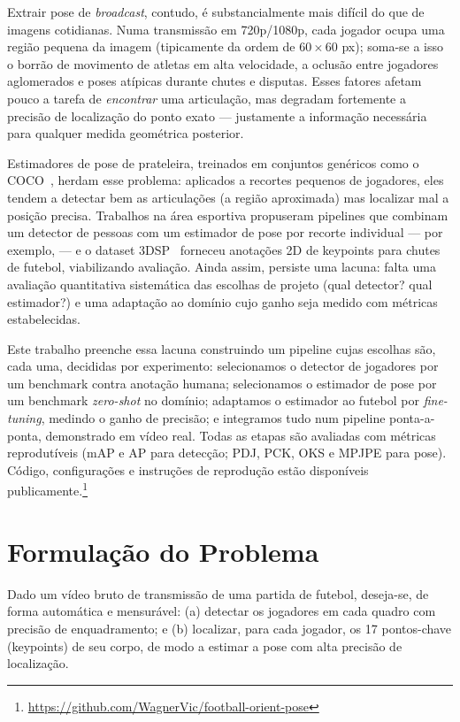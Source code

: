 \documentclass[12pt]{article}
\begin{document}
Extrair pose de \emph{broadcast}, contudo, é substancialmente mais difícil do que de imagens cotidianas. Numa transmissão em 720p/1080p, cada jogador ocupa uma região pequena da imagem (tipicamente da ordem de $60\times60$ px); soma-se a isso o borrão de movimento de atletas em alta velocidade, a oclusão entre jogadores aglomerados e poses atípicas durante chutes e disputas. Esses fatores afetam pouco a tarefa de \emph{encontrar} uma articulação, mas degradam fortemente a precisão de localização do ponto exato --- justamente a informação necessária para qualquer medida geométrica posterior.

Estimadores de pose de prateleira, treinados em conjuntos genéricos como o COCO~\cite{lin2014}, herdam esse problema: aplicados a recortes pequenos de jogadores, eles tendem a detectar bem as articulações (a região aproximada) mas localizar mal a posição precisa. Trabalhos na área esportiva propuseram pipelines que combinam um detector de pessoas com um estimador de pose por recorte individual --- por exemplo, \cite{reis2023} --- e o dataset 3DSP~\cite{yeung2024} forneceu anotações 2D de keypoints para chutes de futebol, viabilizando avaliação. Ainda assim, persiste uma lacuna: falta uma avaliação quantitativa sistemática das escolhas de projeto (qual detector? qual estimador?) e uma adaptação ao domínio cujo ganho seja medido com métricas estabelecidas.

Este trabalho preenche essa lacuna construindo um pipeline cujas escolhas são, cada uma, decididas por experimento: selecionamos o detector de jogadores por um benchmark contra anotação humana; selecionamos o estimador de pose por um benchmark \emph{zero-shot} no domínio; adaptamos o estimador ao futebol por \emph{fine-tuning}, medindo o ganho de precisão; e integramos tudo num pipeline ponta-a-ponta, demonstrado em vídeo real. Todas as etapas são avaliadas com métricas reprodutíveis (mAP e AP para detecção; PDJ, PCK, OKS e MPJPE para pose). Código, configurações e instruções de reprodução estão disponíveis publicamente.\footnote{\url{https://github.com/WagnerVic/football-orient-pose}}

\section{Formulação do Problema}

Dado um vídeo bruto de transmissão de uma partida de futebol, deseja-se, de forma automática e mensurável: (a) detectar os jogadores em cada quadro com precisão de enquadramento; e (b) localizar, para cada jogador, os 17 pontos-chave (keypoints) de seu corpo, de modo a estimar a pose com alta precisão de localização.
\end{document}
